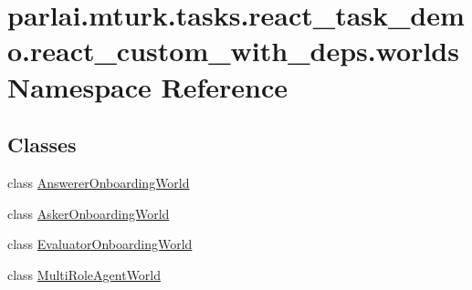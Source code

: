 \hypertarget{namespaceparlai_1_1mturk_1_1tasks_1_1react__task__demo_1_1react__custom__with__deps_1_1worlds}{}\section{parlai.\+mturk.\+tasks.\+react\+\_\+task\+\_\+demo.\+react\+\_\+custom\+\_\+with\+\_\+deps.\+worlds Namespace Reference}
\label{namespaceparlai_1_1mturk_1_1tasks_1_1react__task__demo_1_1react__custom__with__deps_1_1worlds}
\subsection*{Classes}
\begin{DoxyCompactItemize}
\item 
class \hyperlink{classparlai_1_1mturk_1_1tasks_1_1react__task__demo_1_1react__custom__with__deps_1_1worlds_1_1AnswererOnboardingWorld}{Answerer\+Onboarding\+World}
\item 
class \hyperlink{classparlai_1_1mturk_1_1tasks_1_1react__task__demo_1_1react__custom__with__deps_1_1worlds_1_1AskerOnboardingWorld}{Asker\+Onboarding\+World}
\item 
class \hyperlink{classparlai_1_1mturk_1_1tasks_1_1react__task__demo_1_1react__custom__with__deps_1_1worlds_1_1EvaluatorOnboardingWorld}{Evaluator\+Onboarding\+World}
\item 
class \hyperlink{classparlai_1_1mturk_1_1tasks_1_1react__task__demo_1_1react__custom__with__deps_1_1worlds_1_1MultiRoleAgentWorld}{Multi\+Role\+Agent\+World}
\end{DoxyCompactItemize}
